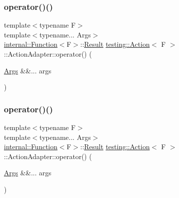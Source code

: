\subsubsection{\texorpdfstring{operator()()}{operator()()}\hspace{0.1cm}{\footnotesize\ttfamily [1/2]}}
{\footnotesize\ttfamily template$<$typename F$>$ \\
template$<$typename... Args$>$ \\
\mbox{\hyperlink{structtesting_1_1internal_1_1_function}{internal\+::\+Function}}$<$F$>$\+::\mbox{\hyperlink{classtesting_1_1_action_a9af08a21ad329331fde856cba9b6dea2}{Result}} \mbox{\hyperlink{classtesting_1_1_action}{testing\+::\+Action}}$<$ F $>$\+::Action\+Adapter\+::operator() (\begin{DoxyParamCaption}\item[{\mbox{\hyperlink{namespacetesting_aaca153f67b689b8b9d5b8c67ecf8cee4}{Args}} \&\&...}]{args }\end{DoxyParamCaption})\hspace{0.3cm}{\ttfamily [inline]}}

\mbox{\label{structtesting_1_1_action_1_1_action_adapter_ab42ccaf9b44b9806303a78db1043c4cb}} 
\subsubsection{\texorpdfstring{operator()()}{operator()()}\hspace{0.1cm}{\footnotesize\ttfamily [2/2]}}
{\footnotesize\ttfamily template$<$typename F$>$ \\
template$<$typename... Args$>$ \\
\mbox{\hyperlink{structtesting_1_1internal_1_1_function}{internal\+::\+Function}}$<$F$>$\+::\mbox{\hyperlink{classtesting_1_1_action_a9af08a21ad329331fde856cba9b6dea2}{Result}} \mbox{\hyperlink{classtesting_1_1_action}{testing\+::\+Action}}$<$ F $>$\+::Action\+Adapter\+::operator() (\begin{DoxyParamCaption}\item[{\mbox{\hyperlink{namespacetesting_aaca153f67b689b8b9d5b8c67ecf8cee4}{Args}} \&\&...}]{args }\end{DoxyParamCaption})\hspace{0.3cm}{\ttfamily [inline]}}



